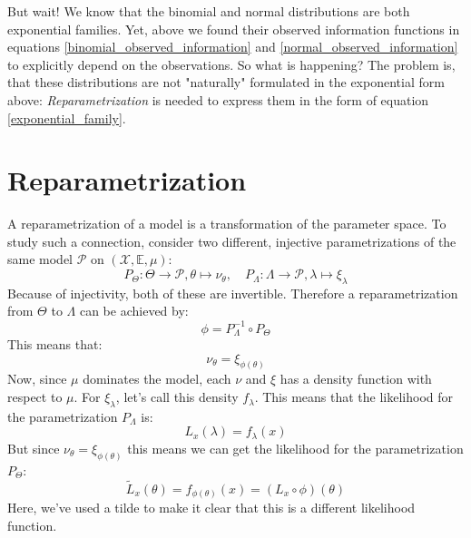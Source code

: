 \documentclass[12pt, a4paper]{article}
\numberwithin{equation}{section}
\begin{document}
But wait! We know that the binomial and normal distributions are both exponential families. Yet, above we found their observed information functions in equations \ref{binomial_observed_information} and \ref{normal_observed_information} to explicitly depend on the observations. So what is happening? The problem is, that these distributions are not "naturally" formulated in the exponential form above: \textit{Reparametrization} is needed to express them in the form of equation \ref{exponential_family}.

\section{Reparametrization}
A reparametrization of a model is a transformation of the parameter space. To study such a connection, consider two different, injective parametrizations of the same model $\mathcal{P}$ on $(\mathcal{X},\mathbb{E},\mu)$:
\begin{equation}
P_\Theta:\Theta\rightarrow\mathcal{P}, \theta\mapsto\nu_\theta,\quad P_\Lambda:\Lambda\rightarrow\mathcal{P},\lambda\mapsto\xi_\lambda
\end{equation}
Because of injectivity, both of these are invertible. Therefore a reparametrization from $\Theta$ to $\Lambda$ can be achieved by:
\begin{equation}
\phi=P_\Lambda^{-1}\circ P_\Theta
\end{equation}
This means that:
\begin{equation}
\nu_\theta=\xi_{\phi(\theta)}
\end{equation}
Now, since $\mu$ dominates the model, each $\nu$ and $\xi$ has a density function with respect to $\mu$. For $\xi_\lambda$, let's call this density $f_\lambda$. This means that the likelihood for the parametrization $P_\Lambda$ is:
\begin{equation}
L_x(\lambda)=f_\lambda(x)
\end{equation}
But since $\nu_\theta=\xi_{\phi(\theta)}$ this means we can get the likelihood for the parametrization $P_\Theta$:
\begin{equation}
\label{reparametrization}
\tilde{L}_x(\theta)=f_{\phi(\theta)}(x)=(L_x\circ\phi)(\theta)
\end{equation}
Here, we've used a tilde to make it clear that this is a different likelihood function.
\end{document}
